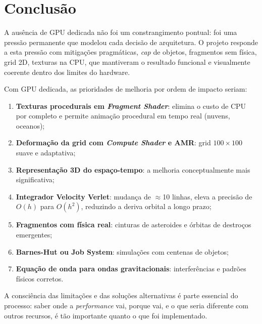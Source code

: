 \documentclass[12pt,a4paper]{article}
\begin{document}
\newpage
\section{Conclus\~{a}o}

A aus\^{e}ncia de GPU dedicada n\~{a}o foi um constrangimento pontual: foi uma press\~{a}o permanente que modelou cada decis\~{a}o de arquitetura. O projeto responde a esta press\~{a}o com mitiga\c{c}\~{o}es pragm\'{a}ticas, \textit{cap} de objetos, fragmentos sem f\'{i}sica, grid 2D, texturas na CPU, que mantiveram o resultado funcional e visualmente coerente dentro dos limites do hardware.

Com GPU dedicada, as prioridades de melhoria por ordem de impacto seriam:

\begin{enumerate}
  \item \textbf{Texturas procedurais em \textit{Fragment Shader}}: elimina o custo de CPU por completo e permite anima\c{c}\~{a}o procedural em tempo real (nuvens, oceanos);
  \item \textbf{Deforma\c{c}\~{a}o da grid com \textit{Compute Shader} e AMR}: grid $100{\times}100$ suave e adaptativa;
  \item \textbf{Representa\c{c}\~{a}o 3D do espa\c{c}o-tempo}: a melhoria conceptualmente mais significativa;
  \item \textbf{Integrador Velocity Verlet}: mudan\c{c}a de $\approx$10 linhas, eleva a precis\~{a}o de $O(h)$ para $O(h^2)$, reduzindo a deriva orbital a longo prazo;
  \item \textbf{Fragmentos com f\'{i}sica real}: cinturas de asteroides e \'{o}rbitas de destro\c{c}os emergentes;
  \item \textbf{Barnes-Hut ou Job System}: simula\c{c}\~{o}es com centenas de objetos;
  \item \textbf{Equa\c{c}\~{a}o de onda para ondas gravitacionais}: interfer\^{e}ncias e padr\~{o}es f\'{i}sicos corretos.
\end{enumerate}

A consci\^{e}ncia das limita\c{c}\~{o}es e das solu\c{c}\~{o}es alternativas \'{e} parte essencial do processo: saber onde a \textit{performance} vai, porque vai, e o que seria diferente com outros recursos, \'{e} t\~{a}o importante quanto o que foi implementado.
\end{document}
